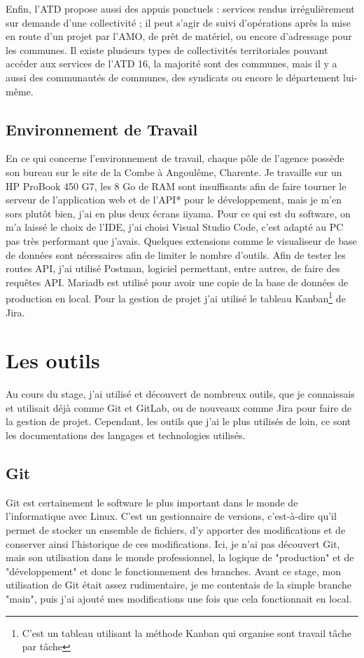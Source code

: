\documentclass[a4paper,12pt]{report}
\begin{document}
Enfin, l'ATD propose aussi des appuis ponctuels : services rendus irrégulièrement sur demande d'une collectivité ; il peut s'agir de suivi d'opérations après la mise en route d'un projet par l'AMO, de prêt de matériel, ou encore d'adressage pour les communes. Il existe plusieurs types de collectivités territoriales pouvant accéder aux services de l'ATD 16, la majorité sont des communes, mais il y a aussi des communautés de communes, des syndicats ou encore le département lui-même.



\subsection{Environnement de Travail}

En ce qui concerne l'environnement de travail, chaque pôle de l'agence possède son bureau sur le site de la Combe à Angoulême, Charente. Je travaille sur un HP ProBook 450 G7, les 8 Go de RAM sont insuffisants afin de faire tourner le serveur de l'application web et de l'API* pour le développement, mais je m'en sors plutôt bien, j'ai en plus deux écrans iiyama. Pour ce qui est du software, on m'a laissé le choix de l'IDE, j'ai choisi Visual Studio Code, c'est adapté au PC pas très performant que j'avais. Quelques extensions comme le visualiseur de base de données sont nécessaires afin de limiter le nombre d'outils. Afin de tester les routes API, j'ai utilisé Postman, logiciel permettant, entre autres, de faire des requêtes API. Mariadb est utilisé pour avoir une copie de la base de données de production en local. Pour la gestion de projet j'ai utilisé le tableau Kanban\footnote{C'est un tableau utilisant la méthode Kanban qui organise sont travail tâche par tâche} de Jira.

\section{Les outils}
Au cours du stage, j'ai utilisé et découvert de nombreux outils, que je connaissais et utilisait déjà comme Git et GitLab, ou de nouveaux comme Jira pour faire de la gestion de projet. Cependant, les outils que j'ai le plus utilisés de loin, ce sont les documentations des langages et technologies utilisés.

\subsection{Git}
Git est certainement le software le plus important dans le monde de l'informatique avec Linux. C'est un gestionnaire de versions, c'est-à-dire qu'il permet de stocker un ensemble de fichiers, d'y apporter des modifications et de conserver ainsi l'historique de ces modifications. Ici, je n'ai pas découvert Git, mais son utilisation dans le monde professionnel, la logique de "production" et de "développement" et donc le fonctionnement des branches. Avant ce stage, mon utilisation de Git était assez rudimentaire, je me contentais de la simple branche "main", puis j'ai ajouté mes modifications une fois que cela fonctionnait en local.
\end{document}
